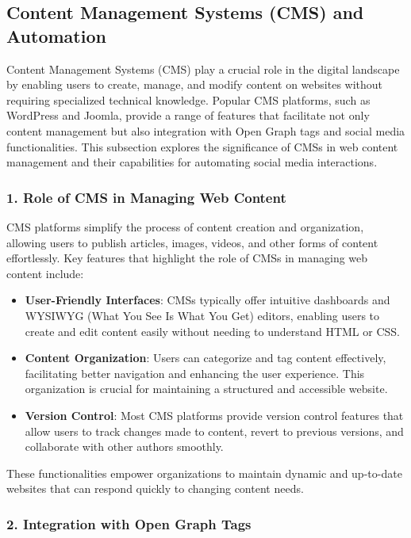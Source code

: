 \subsection{Content Management Systems (CMS) and Automation}
\label{subsec:content_management_systems_cms_and_automation}

Content Management Systems (CMS) play a crucial role in the digital landscape by enabling users to create, manage, and modify content on websites without requiring specialized technical knowledge. Popular CMS platforms, such as WordPress and Joomla, provide a range of features that facilitate not only content management but also integration with Open Graph tags and social media functionalities. This subsection explores the significance of CMSs in web content management and their capabilities for automating social media interactions.

\subsubsection{1. Role of CMS in Managing Web Content}

CMS platforms simplify the process of content creation and organization, allowing users to publish articles, images, videos, and other forms of content effortlessly. Key features that highlight the role of CMSs in managing web content include:

\begin{itemize}
    \item \textbf{User-Friendly Interfaces}: CMSs typically offer intuitive dashboards and WYSIWYG (What You See Is What You Get) editors, enabling users to create and edit content easily without needing to understand HTML or CSS.
    \item \textbf{Content Organization}: Users can categorize and tag content effectively, facilitating better navigation and enhancing the user experience. This organization is crucial for maintaining a structured and accessible website.
    \item \textbf{Version Control}: Most CMS platforms provide version control features that allow users to track changes made to content, revert to previous versions, and collaborate with other authors smoothly.
\end{itemize}

These functionalities empower organizations to maintain dynamic and up-to-date websites that can respond quickly to changing content needs.

\subsubsection{2. Integration with Open Graph Tags}

